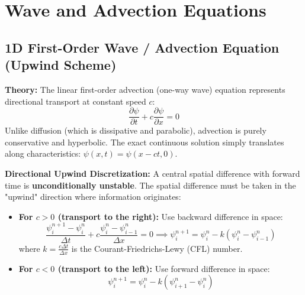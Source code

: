 \documentclass{article}
\begin{document}
\section{Wave and Advection Equations}

\subsection{1D First-Order Wave / Advection Equation (Upwind Scheme)}
\textbf{Theory:} The linear first-order advection (one-way wave) equation represents directional transport at constant speed $c$:
$$\frac{\partial \psi}{\partial t} + c \frac{\partial \psi}{\partial x} = 0$$
Unlike diffusion (which is dissipative and parabolic), advection is purely conservative and hyperbolic. The exact continuous solution simply translates along characteristics: $\psi(x, t) = \psi(x - ct, 0)$.

\textbf{Directional Upwind Discretization:}
A central spatial difference with forward time is \textbf{unconditionally unstable}. The spatial difference must be taken in the "upwind" direction where information originates:
\begin{itemize}
    \item \textbf{For $c > 0$ (transport to the right):} Use backward difference in space:
    $$\frac{\psi_i^{n+1} - \psi_i^n}{\Delta t} + c \frac{\psi_i^n - \psi_{i-1}^n}{\Delta x} = 0 \implies \psi_i^{n+1} = \psi_i^n - k (\psi_i^n - \psi_{i-1}^n)$$
    where $k = \frac{c \Delta t}{\Delta x}$ is the Courant-Friedrichs-Lewy (CFL) number.
    \item \textbf{For $c < 0$ (transport to the left):} Use forward difference in space:
    $$\psi_i^{n+1} = \psi_i^n - k (\psi_{i+1}^n - \psi_i^n)$$
\end{itemize}
\end{document}
